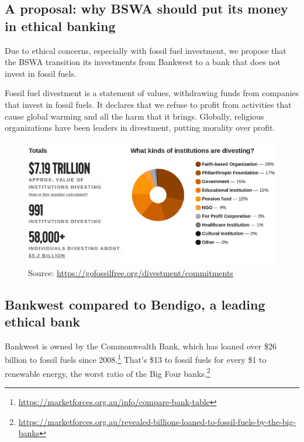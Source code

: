 \documentclass[11pt]{article}
\begin{document}
\pagestyle{empty}

\subsection*{A proposal: why BSWA should put its money in ethical banking}

Due to ethical concerns, especially with fossil fuel investment, we propose that the BSWA transition its investments from Bankwest to a bank that does not invest in fossil fuels.

Fossil fuel divestment is a statement of values, withdrawing funds from companies that invest in fossil fuels. It declares that we refuse to profit from activities that cause global warming and all the harm that it brings. Globally, religious organizations have been leaders in divestment, putting morality over profit.

\bigskip

\begin{figure}[h]
\includegraphics[width=15.9cm]{divestment.png}\\
\sffamily\scriptsize{Source: \url{https://gofossilfree.org/divestment/commitments}}
\end{figure}

\subsection*{Bankwest compared to Bendigo, a leading ethical bank}

Bankwest is owned by the Commonwealth Bank, which has loaned over \$26 billion to fossil fuels since 2008.\footnote{\url{https://marketforces.org.au/info/compare-bank-table}} That’s \$13 to fossil fuels for every \$1 to renewable energy, the worst ratio of the Big Four banks.\footnote{\url{https://marketforces.org.au/revealed-billions-loaned-to-fossil-fuels-by-the-big-banks}}
\end{document}
